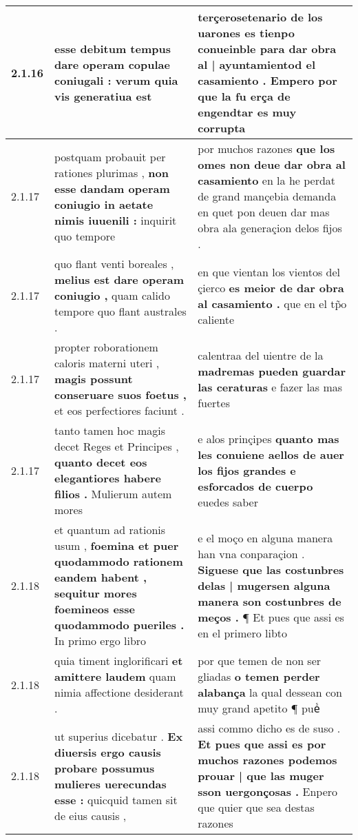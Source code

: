 \begin{tabular}{|p{1cm}|p{6.5cm}|p{6.5cm}|}
2.1.16 & esse debitum tempus \textbf{ dare operam copulae coniugali : } verum quia vis generatiua est & terçerosetenario de los uarones es tienpo conueinble \textbf{ para dar obra al | ayuntamientod el casamiento . } Empero por que la fu erça de engendtar es muy corrupta \\\hline
2.1.17 & postquam probauit per rationes plurimas , \textbf{ non esse dandam operam coniugio in aetate nimis iuuenili : } inquirit quo tempore & por muchos razones \textbf{ que los omes non deue dar obra al casamiento } en la he perdat de grand mançebia demanda en quet pon deuen dar mas obra ala generaçion delos fijos . \\\hline
2.1.17 & quo flant venti boreales , \textbf{ melius est dare operam coniugio , } quam calido tempore quo flant australes . & en que vientan los vientos del çierco \textbf{ es meior de dar obra al casamiento . } que en el tp̃o caliente \\\hline
2.1.17 & propter roborationem caloris materni uteri , \textbf{ magis possunt conseruare suos foetus , } et eos perfectiores faciunt . & calentraa del uientre de la \textbf{ madremas pueden guardar las ceraturas } e fazer las mas fuertes \\\hline
2.1.17 & tanto tamen hoc magis decet Reges et Principes , \textbf{ quanto decet eos elegantiores habere filios . } Mulierum autem mores & e alos prinçipes \textbf{ quanto mas les conuiene aellos de auer los fijos grandes e esforcados de cuerpo } euedes saber \\\hline
2.1.18 & et quantum ad rationis usum , \textbf{ foemina et puer quodammodo rationem eandem habent , sequitur mores foemineos esse quodammodo pueriles . } In primo ergo libro & e el moço en alguna manera han vna conparaçion . \textbf{ Siguese que las costunbres delas | mugersen alguna manera son costunbres de meços . } ¶ Et pues que assi es en el primero libto \\\hline
2.1.18 & quia timent inglorificari \textbf{ et amittere laudem } quam nimia affectione desiderant . & por que temen de non ser gliadas \textbf{ o temen perder alabança } la qual dessean con muy grand apetito ¶ pueᷤ \\\hline
2.1.18 & ut superius dicebatur . \textbf{ Ex diuersis ergo causis probare possumus mulieres uerecundas esse : } quicquid tamen sit de eius causis , & assi commo dicho es de suso . \textbf{ Et pues que assi es por muchos razones podemos prouar | que las muger sson uergonçosas . } Enpero que quier que sea destas razones \\\hline

\end{tabular}
